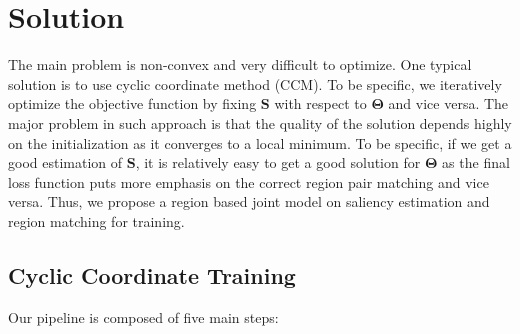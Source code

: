 \section{Solution}
\label{sec:solution}
The main problem is non-convex and very difficult to optimize. 
One typical solution is to use cyclic coordinate method (CCM)\cite{GorskiPK07}. 
To be specific, we iteratively optimize the objective function by fixing $\mathbf{S}$ with respect to $\mathbf{\Theta}$ and vice versa. 
The major problem in such approach is that the quality of the solution depends highly on the initialization as it converges to a local minimum. 
To be specific, if we get a good estimation of $\mathbf{S}$, it is relatively easy to get a good solution for $\mathbf{\Theta}$ as the final loss function puts more emphasis on the correct region pair matching and vice versa. 
Thus, we propose a region based joint model on saliency estimation and region matching for training. 

\subsection{Cyclic Coordinate Training}
Our pipeline is composed of five main steps: 

